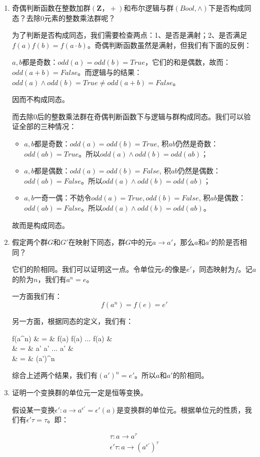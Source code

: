 \documentclass[UTF8]{article}
\begin{document}
\begin{enumerate}
\item 奇偶判断函数在整数加群$(\pmb{Z}，+)$和布尔逻辑与群$(Bool, \land)$下是否构成同态？去除0元素的整数乘法群呢？

为了判断是否构成同态，我们需要检查两点：1、是否是满射；2、是否满足$f(a) f (b) = f(a \cdot b)$。奇偶判断函数虽然是满射，但我们有下面的反例：

$a, b$都是奇数：$odd(a) = odd(b) = True$，它们的和是偶数，故而：$odd(a + b) = False$。而逻辑与的结果：$odd(a) \land odd(b) = True \neq odd(a + b) = False$。

因而不构成同态。

而去除0后的整数乘法群在奇偶判断函数下与逻辑与群构成同态。我们可以验证全部的三种情况：

  \begin{itemize}
  \item $a, b$都是奇数：$odd(a) = odd(b) = True$, 积$ab$仍然是奇数：$odd(ab) = True$。所以$odd(a) \land odd(b) = odd(ab)$；
  \item $a, b$都是偶数：$odd(a) = odd(b) = False$, 积$ab$仍然是偶数：$odd(ab) = False$。所以$odd(a) \land odd(b) = odd(ab)$；
  \item $a, b$一奇一偶：不妨令$odd(a) = True, odd(b) = False$, 积$ab$是偶数：$odd(ab) = False$。所以$odd(a) \land odd(b) = odd(ab)$。
  \end{itemize}

故而是构成同态。

\item 假定两个群$G$和$G'$在映射下同态，群$G$中的元$a \to a'$，那么$a$和$a'$的阶是否相同？

它们的阶相同。我们可以证明这一点。令单位元$e$的像是$e'$，同态映射为$f$。记$a$的阶为$n$，我们有$a^n = e$。

一方面我们有：
\[
f(a^n) = f(e) = e'
\]

另一方面，根据同态的定义，我们有：

\bre
f(a^n) & = & f(a) f(a) ... f(a) &  \\
  & = & a' a' ... a' &  \\
  & = & (a')^n
\ere

综合上述两个结果，我们有$(a')^n = e'$。所以$a$和$a'$的阶相同。

\item 证明一个变换群的单位元一定是恒等变换。

假设某一变换$\epsilon': a \to a^{\epsilon'} = \epsilon'(a)$是变换群的单位元。根据单位元的性质，我们有$\epsilon' \tau = \tau$。即：

\[
\begin{array}{l}
\tau: a \to a^\tau \\
\epsilon' \tau: a \to (a^{\epsilon'})^\tau \\
\end{array}
\]


\end{enumerate}
\end{document}
